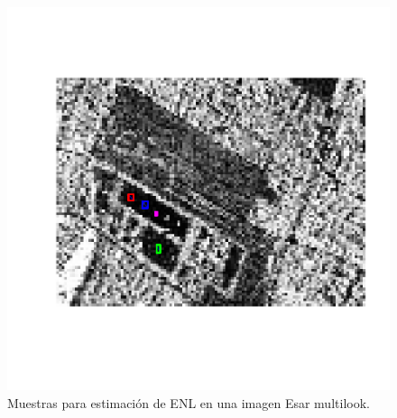 \begin{figure}[htb]
	\centering
	\includegraphics[width=0.8\linewidth]{../../Figures/Tesis/ImagenReal/MuestrasEstimNumLooks.pdf}
	\caption{\label{MuestraLooks}\small Muestras para estimación de ENL en una imagen Esar multilook.}
\end{figure}


